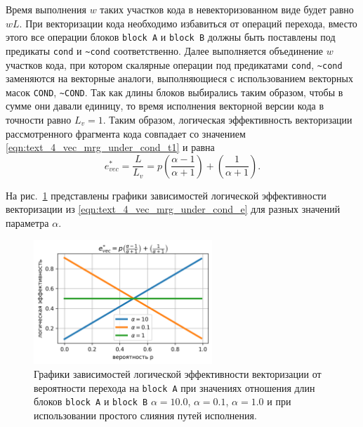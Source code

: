 Время выполнения $w$ таких участков кода в невекторизованном виде будет равно $wL$.
При векторизации кода необходимо избавиться от операций перехода, вместо этого все операции блоков \texttt{block A} и \texttt{block B} должны быть поставлены под предикаты \texttt{cond} и \texttt{\textasciitilde cond} соответственно.
Далее выполняется объединение $w$ участков кода, при котором скалярные операции под предикатами \texttt{cond}, \texttt{\textasciitilde cond} заменяются на векторные аналоги, выполняющиеся с использованием векторных масок \texttt{COND}, \texttt{\textasciitilde COND}.
Так как длины блоков выбирались таким образом, чтобы в сумме они давали единицу, то время исполнения векторной версии кода в точности равно $L_v = 1$.
Таким образом, логическая эффективность векторизации рассмотренного фрагмента кода совпадает со значением \eqref{eqn:text_4_vec_mrg_under_cond_t1} и равна
\begin{equation}\label{eqn:text_4_vec_mrg_under_cond_e}
	e_{vec}^{*} = \frac{L}{L_v} = p\left(\frac{\alpha - 1}{\alpha + 1}\right) + \left(\frac{1}{\alpha + 1}\right).
\end{equation}

На рис.~\ref{fig:text_4_vec_under_cond_chart_e_merged} представлены графики зависимостей логической эффективности векторизации из \eqref{eqn:text_4_vec_mrg_under_cond_e} для разных значений параметра $\alpha$.

\begin{figure}[ht]
\centering
\includegraphics[width=0.6\textwidth]{./fig/vec_ifconv_nocheck_chart.png}
\singlespacing
{}\caption{Графики зависимостей логической эффективности векторизации от вероятности перехода на \texttt{block A} при значениях отношения длин блоков \texttt{block A} и \texttt{block B} $\alpha = 10.0$, $\alpha = 0.1$, $\alpha = 1.0$ и при использовании простого слияния путей исполнения.}
\label{fig:text_4_vec_under_cond_chart_e_merged}
\end{figure}

